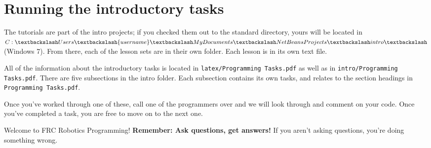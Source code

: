 \documentclass[a4paper]{article}
\begin{document}
\section{Running the introductory tasks}

The tutorials are part of the intro projects; if you checked them out to the standard directory, yours will be located in $C:\textbackslash Users\textbackslash\{username\}\textbackslash My Documents\textbackslash NetBeansProjects\textbackslash intro\textbackslash$ (Windows 7). From there, each of the lesson sets are in their own folder. Each lesson is in its own text file.

All of the information about the introductory tasks is located in \lstinline{latex/Programming Tasks.pdf} as well as in \lstinline{intro/Programming Tasks.pdf}. There are five subsections in the intro folder. Each subsection contains its own tasks, and relates to the section headings in \lstinline{Programming Tasks.pdf}. 

Once you've worked through one of these, call one of the programmers over and we will look through and comment on your code. Once you've completed a task, you are free to move on to the next one. 

Welcome to FRC Robotics Programming! \textbf{Remember: Ask questions, get answers!} If you aren't asking questions, you're doing something wrong.
\end{document}
